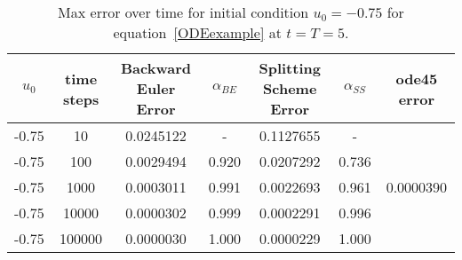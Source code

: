 


\begin{table}[H]                               
\centering                                     
\begin{tabular}{|c|c|c|c|c|c||c|} 
\hline                                        
$u_0$ & time steps & Backward Euler Error & $\alpha_{BE}$ & Splitting Scheme Error & $\alpha_{SS}$ & ode45 error \\
\hline                                         
-0.75 & 10 & 0.0245122 & - & 0.1127655 & - & \multirow{5}{*}{0.0000390 } \\      
\hhline{------~}                          
-0.75 & 100 & 0.0029494 & 0.920 & 0.0207292 & 0.736 &  \\       
\hhline{------~}                                            
-0.75 & 1000 & 0.0003011 & 0.991 & 0.0022693 & 0.961 & \\      
\hhline{------~}                                         
-0.75 & 10000 & 0.0000302 & 0.999 & 0.0002291 & 0.996 &  \\     
\hhline{------~}                                         
-0.75 & 100000 & 0.0000030 & 1.000 & 0.0000229 & 1.000 &  \\   
\hline                                          
\end{tabular}                                 
\caption{Max error over time for initial condition $u_0=-0.75$ for equation~\eqref{ODEexample} at $t=T=5$.}                   \label{table:erroru0n075}                                 
\end{table}    

